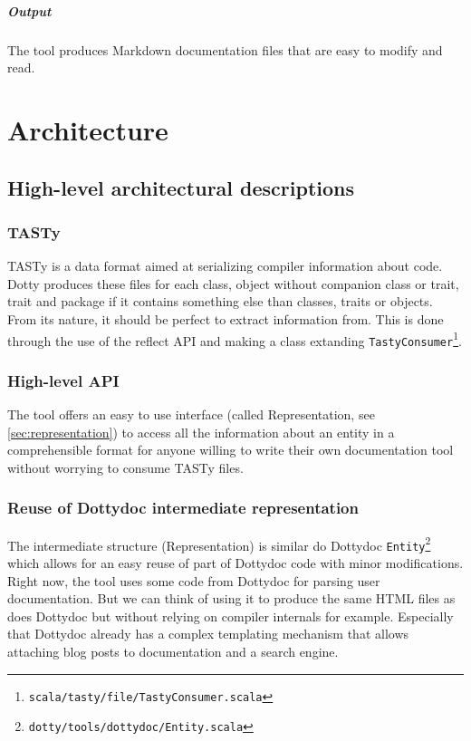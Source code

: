 \documentclass{report}
\begin{document}
\paragraph{Output}
The tool produces Markdown documentation files that are easy to modify and read.

\chapter{Architecture}
\section{High-level architectural descriptions}
\subsection{TASTy}
TASTy is a data format aimed at serializing compiler information about code. Dotty produces these files for each class, object without companion class or trait, trait and package if it contains something else than classes, traits or objects. From its nature, it should be perfect to extract information from.
This is done through the use of the reflect API and making a class extanding \texttt{TastyConsumer}\footnote{\texttt{scala/tasty/file/TastyConsumer.scala}}.

\subsection{High-level API}
The tool offers an easy to use interface (called Representation, see \autoref{sec:representation}) to access all the information about an entity in a comprehensible format for anyone willing to write their own documentation tool without worrying to consume TASTy files.

\subsection{Reuse of Dottydoc intermediate representation}
The intermediate structure (Representation) is similar do Dottydoc \texttt{Entity}\footnote{\texttt{dotty/tools/dottydoc/Entity.scala}} which allows for an easy reuse of part of Dottydoc code with minor modifications. Right now, the tool uses some code from Dottydoc for parsing user documentation. But we can think of using it to produce the same HTML files as does Dottydoc but without relying on compiler internals for example. Especially that Dottydoc already has a complex templating mechanism that allows attaching blog posts to documentation and a search engine.
\end{document}
